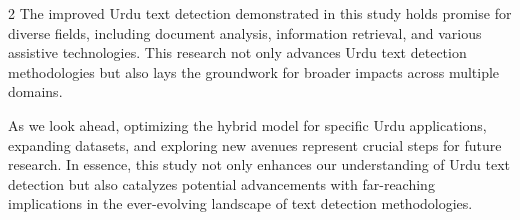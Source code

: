 \documentclass[sn-mathphys,Numbered]{sn-jnl}%
\begin{document}
\begin{multicols}{2}
The improved Urdu text detection demonstrated in this study holds promise for diverse fields, including document analysis, information retrieval, and various assistive technologies. This research not only advances Urdu text detection methodologies but also lays the groundwork for broader impacts across multiple domains.

As we look ahead, optimizing the hybrid model for specific Urdu applications, expanding datasets, and exploring new avenues represent crucial steps for future research. In essence, this study not only enhances our understanding of Urdu text detection but also catalyzes potential advancements with far-reaching implications in the ever-evolving landscape of text detection methodologies.
\backmatter


\end{multicols}
\end{document}

